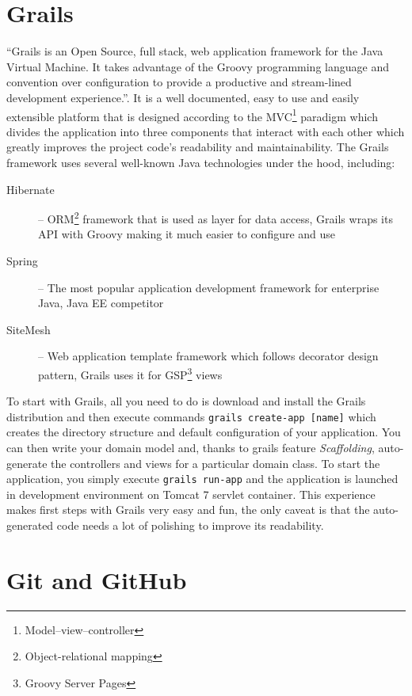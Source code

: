 \section{Grails}

``Grails is an Open Source, full stack, web application framework for the Java Virtual Machine. It takes advantage of the Groovy programming language and convention over configuration to provide a productive and stream-lined development experience.''\cite{grails-homepage}. It is a well documented, easy to use and easily extensible platform that is designed according to the MVC\footnote{Model--view--controller} paradigm which divides the application into three components that interact with each other which greatly improves the project code's readability and maintainability. The Grails framework uses several well-known Java technologies under the hood, including:

\begin{description}
    \item[Hibernate] -- ORM\footnote{Object-relational mapping} framework that is used as layer for data access, Grails wraps its API with Groovy making it much easier to configure and use
    \item[Spring] -- The most popular application development framework for enterprise Java\cite{springsource-homepage}, Java EE competitor
    \item[SiteMesh] -- Web application template framework which follows decorator design pattern, Grails uses it for GSP\footnote{Groovy Server Pages} views
\end{description}

To start with Grails, all you need to do is download and install the Grails distribution and then execute commands \texttt{grails create-app [name]} which creates the directory structure and default configuration of your application. You can then write your domain model and, thanks to grails feature \emph{Scaffolding}, auto-generate the controllers and views for a particular domain class. To start the application, you simply execute \texttt{grails run-app} and the application is launched in development environment on Tomcat 7 servlet container. This experience makes first steps with Grails very easy and fun, the only caveat is that the auto-generated code needs a lot of polishing to improve its readability.

\section{Git and GitHub}


